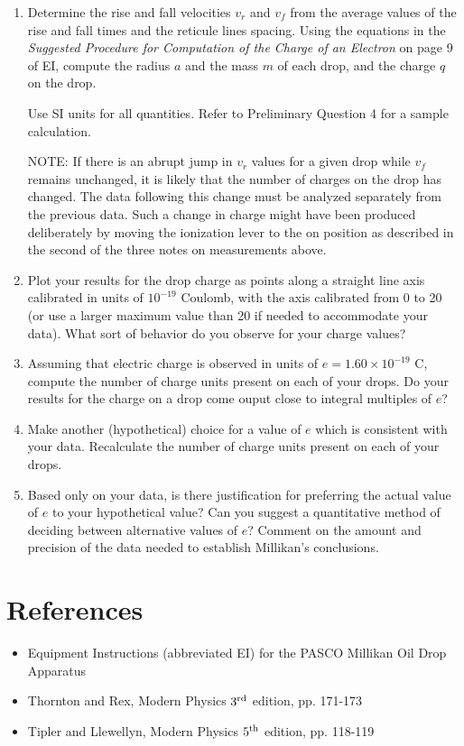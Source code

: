 \documentclass{article}
\begin{document}
\begin{enumerate}
\item Determine the rise and fall velocities
$v_r$ and $v_f$ from the average values of the
rise and fall times and the reticule lines spacing. Using the equations
in the {\em Suggested Procedure for Computation of
the Charge of an Electron} on page 9 of EI,
compute the radius $a$ and the mass $m$ of each drop, and the charge $q$ on
the drop.

Use SI units for all quantities.  Refer to Preliminary Question 4 for a
sample calculation.

NOTE: If there is an abrupt jump in
$v_r$ values for a given drop while
$v_f$ remains unchanged, it is likely
that the number of charges on the drop has changed.  The data
following this change must be analyzed separately from the previous
data.  Such a change in charge might have been produced deliberately
by moving the ionization lever to the on position as described in the
second of the three notes on measurements above.

\item Plot your results for the drop charge as points along a
straight line axis calibrated in units of
$10^{-19}$ Coulomb, with the axis
calibrated from 0 to 20 (or use a larger maximum value than 20 if
needed to accommodate your data).  What sort of behavior do you
observe for your charge values?

\item Assuming that electric charge is observed in units of $e =
1.60 \times 10^{-19}$ C, compute the
number of charge units present on each of your drops.  Do your results
for the charge on a drop come ouput close to integral multiples of $e$?

\item Make another (hypothetical) choice for a value of $e$ which is
consistent with your data.  Recalculate the number of charge units
present on each of your drops.

\item Based only on your data, is there justification for preferring the
actual value of $e$ to your hypothetical value?  Can you suggest a quantitative method of deciding
between alternative values of $e$?  Comment on the amount and precision
of the data needed to establish Millikan's
conclusions.
\end{enumerate}

\section{References}

\begin{itemize}
\item Equipment Instructions (abbreviated EI) for the PASCO Millikan Oil Drop Apparatus
\item Thornton and Rex, Modern Physics $3^{\rm rd}$ edition, pp. 171-173
\item Tipler and Llewellyn, Modern Physics $5^{\rm th}$ edition, pp. 118-119
\end{itemize}


\bigskip
\end{document}
